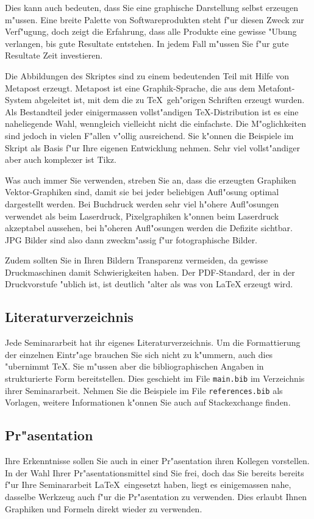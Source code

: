 \documentclass[a4paper,12pt]{article}
\begin{document}
Dies kann auch bedeuten, dass Sie eine graphische Darstellung selbst
erzeugen m"ussen.
Eine breite Palette von Softwareprodukten steht f"ur diesen Zweck
zur Verf"ugung, doch zeigt die Erfahrung, dass alle Produkte
eine gewisse "Ubung verlangen, bis gute Resultate entstehen.
In jedem Fall m"ussen Sie f"ur gute Resultate Zeit investieren.

Die Abbildungen des Skriptes sind zu einem bedeutenden Teil mit
Hilfe von Metapost erzeugt.
Metapost ist eine Graphik-Sprache, die aus dem Metafont-System abgeleitet ist,
mit dem die zu \TeX\ geh"origen Schriften erzeugt wurden.
Als Bestandteil jeder einigermassen vollst"andigen \TeX-Distribution
ist es eine naheliegende Wahl, wenngleich vielleicht nicht die einfachste.
Die M"oglichkeiten sind jedoch in vielen F"allen v"ollig ausreichend.
Sie k"onnen die Beispiele im Skript als Basis f"ur Ihre eigenen Entwicklung
nehmen.
Sehr viel vollst"andiger aber auch komplexer ist Tikz.

Was auch immer Sie verwenden, streben Sie an, dass die erzeugten Graphiken
Vektor-Graphiken sind, damit sie bei jeder beliebigen Aufl"osung
optimal dargestellt werden.
Bei Buchdruck werden sehr viel h"ohere Aufl"osungen verwendet als
beim Laserdruck, Pixelgraphiken k"onnen beim Laserdruck akzeptabel
aussehen, bei h"oheren Aufl"osungen werden die Defizite sichtbar.
JPG Bilder sind also dann zweckm"assig f"ur fotographische Bilder.

Zudem sollten Sie in Ihren Bildern Transparenz vermeiden, da gewisse
Druckmaschinen damit Schwierigkeiten haben. Der PDF-Standard, der
in der Druckvorstufe "ublich ist, ist deutlich "alter als was von
\LaTeX{} erzeugt wird.

\subsection{Literaturverzeichnis}
Jede Seminararbeit hat ihr eigenes Literaturverzeichnis.
Um die Formattierung der einzelnen Eintr"age brauchen Sie sich nicht
zu k"ummern, auch dies "ubernimmt \TeX.
Sie m"ussen aber die bibliographischen Angaben in strukturierte
Form bereitstellen. 
Dies geschieht im File \texttt{main.bib} im Verzeichnis ihrer
Seminararbeit.
Nehmen Sie die Beispiele im File \texttt{references.bib} als
Vorlagen, weitere Informationen k"onnen Sie auch auf Stackexchange finden.

\subsection{Pr"asentation}
Ihre Erkenntnisse sollen Sie auch in einer Pr"asentation ihren Kollegen
vorstellen.
In der Wahl Ihrer Pr"asentationsmittel sind Sie frei, doch das Sie
bereits bereits f"ur Ihre Seminararbeit \LaTeX\ eingesetzt haben, 
liegt es einigemassen nahe, dasselbe Werkzeug auch f"ur die Pr"asentation
zu verwenden.
Dies erlaubt Ihnen Graphiken und Formeln direkt wieder zu verwenden.
\end{document}
